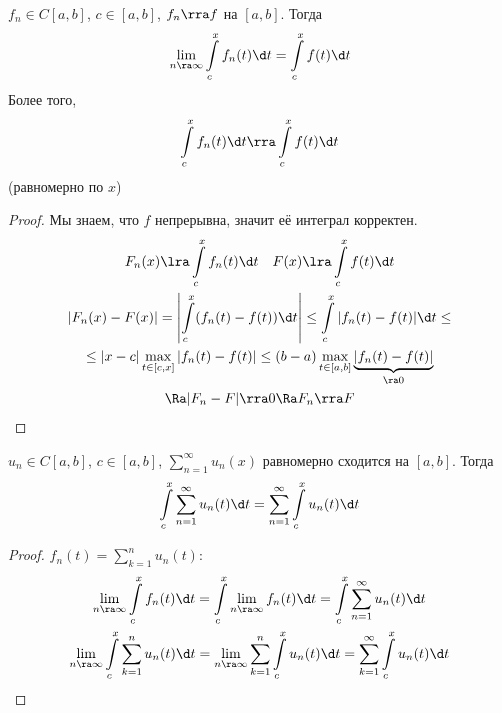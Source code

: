 \begin{theorem}
	$f_n \in C[a,b]$, $c \in [a,b]$, $f_n \rra f$ на $[a, b]$.
	Тогда
	\[ \lim_{n \ra \infty} \int\limits_c^x f_n(t) \d t = \int\limits_c^x f(t) \d t \]
	Более того,
	\[ \int\limits_c^x f_n(t) \d t \rra \int\limits_c^x f(t) \d t \]
	(равномерно по $x$)
\end{theorem}
\begin{proof}
	Мы знаем, что $f$ непрерывна, значит её интеграл корректен.
	\begin{gather*}
		F_n(x) \lra \int\limits_c^x f_n(t) \d t \quad F(x) \lra \int\limits_c^x f(t) \d t \\
		\left| F_n(x) - F(x) \right|
		= \left| \int\limits_c^x (f_n(t) - f(t)) \d t \right|
		\le \int\limits_c^x |f_n(t) - f(t)| \d t \le \\
		\le |x - c| \max_{t \in [c,x]} |f_n(t) - f(t)|
		\le (b - a) \max_{t \in [a,b]} \underbrace{|f_n(t) - f(t)|}_{\ra 0} \\
		\Ra |F_n - F| \rra 0
		\Ra F_n \rra F
	\end{gather*}
\end{proof}

\begin{conseq}
	$u_n \in C[a,b]$, $c \in [a, b]$, $\sum_{n=1}^\infty u_n(x)$ равномерно сходится на $[a,b]$.
	Тогда
	\[ \int\limits_c^x \sum_{n=1}^\infty u_n(t) \d t = \sum_{n=1}^\infty \int\limits_c^x u_n(t) \d t \]
\end{conseq}
\begin{proof}
	$f_n(t) = \sum_{k=1}^n u_n(t)$:
	\begin{gather*}
		\lim_{n \ra \infty} \int\limits_c^x f_n(t) \d t
		= \int\limits_c^x \lim_{n \ra \infty} f_n(t) \d t
		= \int\limits_c^x \sum_{n=1}^\infty u_n(t) \d t \\
		\lim_{n \ra \infty} \int\limits_c^x \sum_{k=1}^n u_n(t) \d t
		= \lim_{n \ra \infty} \sum_{k=1}^n \int\limits_c^x u_n(t) \d t
		= \sum_{k=1}^\infty \int\limits_c^x u_n(t) \d t
	\end{gather*}
\end{proof}

